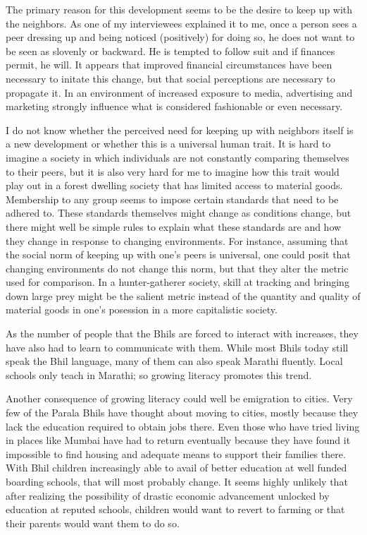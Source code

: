 \documentclass[report.tex]{subfiles}
\begin{document}
The primary reason for this development seems to be the desire to keep up with the neighbors. As one of my interviewees explained it to me, once a person sees a peer dressing up and being noticed (positively) for doing so, he does not want to be seen as slovenly or backward. He is tempted to follow suit and if finances permit, he will. It appears that improved financial circumstances have been necessary to initate this change, but that social perceptions are necessary to propagate it. In an environment of increased exposure to media, advertising and marketing strongly influence what is considered fashionable or even necessary.

I do not know whether the perceived need for keeping up with neighbors itself is a new development or whether this is a universal human trait. It is hard to imagine a society in which individuals are not constantly comparing themselves to their peers, but it is also very hard for me to imagine how this trait would play out in a forest dwelling society that has limited access to material goods. Membership to any group seems to impose certain standards that need to be adhered to. These standards themselves might change as conditions change, but there might well be simple rules to explain what these standards are and how they change in response to changing environments. For instance, assuming that the social norm of keeping up with one's peers is universal, one could posit that changing environments do not change this norm, but that they alter the metric used for comparison. In a hunter-gatherer society, skill at tracking and bringing down large prey might be the salient metric instead of the quantity and quality of material goods in one's posession in a more capitalistic society.

As the number of people that the Bhils are forced to interact with increases, they have also had to learn to communicate with them. While most Bhils today still speak the Bhil language, many of them can also speak Marathi fluently. Local schools only teach in Marathi; so growing literacy promotes this trend.

Another consequence of growing literacy could well be emigration to cities. Very few of the Parala Bhils have thought about moving to cities, mostly because they lack the education required to obtain jobs there. Even those who have tried living in places like Mumbai have had to return eventually because they have found it impossible to find housing and adequate means to support their families there. With Bhil children increasingly able to avail of better education at well funded boarding schools, that will most probably change. It seems highly unlikely that after realizing the possibility of drastic economic advancement unlocked by education at reputed schools, children would want to revert to farming or that their parents would want them to do so.
\end{document}
